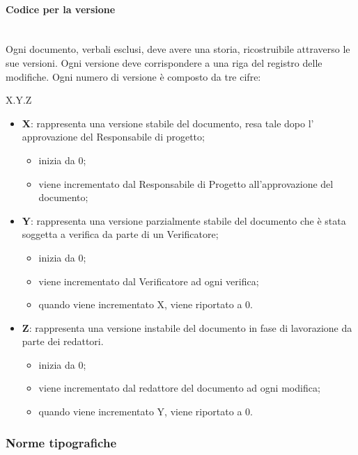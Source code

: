 		\paragraph{Codice per la versione} \mbox{}\\
		Ogni documento, verbali esclusi, deve avere una storia, ricostruibile attraverso le sue versioni. Ogni versione deve corrispondere a una riga del registro delle modifiche. Ogni numero di versione è composto da tre cifre:
		\begin{center}
			X.Y.Z
		\end{center}
		\begin{itemize}
			\item \textbf{X}: rappresenta una versione stabile del documento, resa tale dopo l' approvazione del Responsabile di progetto;
			\begin{itemize}
				\item inizia da 0;
				\item viene incrementato dal Responsabile di Progetto all’approvazione
				del documento;
			\end{itemize}
			\item \textbf{Y}: rappresenta una versione parzialmente stabile del documento che è stata soggetta a verifica da parte di un Verificatore;
			\begin{itemize}
				\item inizia da 0;
				\item viene incrementato dal Verificatore ad ogni verifica;
				\item quando viene incrementato X, viene riportato a 0.
			\end{itemize}
			\item \textbf{Z}: rappresenta una versione instabile del documento in fase di lavorazione da parte dei redattori.
			\begin{itemize}
				\item inizia da 0;
				\item viene incrementato dal redattore del documento ad ogni modifica;
				\item quando viene incrementato Y, viene riportato a 0.
			\end{itemize}			
		\end{itemize}
		\subsubsection{Norme tipografiche}
